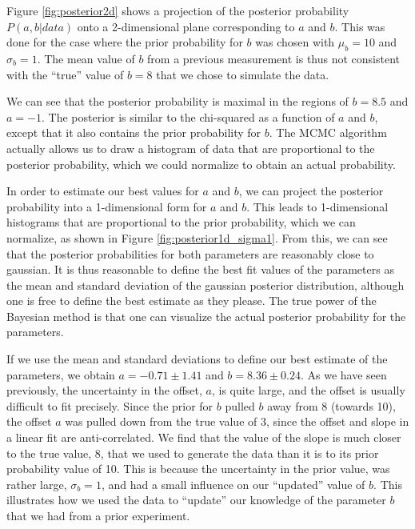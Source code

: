 Figure \ref{fig:posterior2d} shows a projection of the posterior probability $P(a,b|data)$ onto a 2-dimensional plane corresponding to $a$ and $b$. This was done for the case where the prior probability for $b$ was chosen with $\mu_b=10$ and $\sigma_b=1$. The mean value of $b$ from a previous measurement is thus not consistent with the ``true'' value of $b=8$ that we chose to simulate the data. 

We can see that the posterior probability is maximal in the regions of $b=8.5$ and $a=-1$. The posterior is similar to the chi-squared as a function of $a$ and $b$, except that it also contains the prior probability for $b$. The MCMC algorithm actually allows us to draw a histogram of data that are proportional to the posterior probability, which we could normalize to obtain an actual probability.


In order to estimate our best values for $a$ and $b$, we can project the posterior probability into a 1-dimensional form for $a$ and $b$. This leads to 1-dimensional histograms that are proportional to the prior probability, which we can normalize, as shown in Figure \ref{fig:posterior1d_sigma1}. From this, we can see that the posterior probabilities for both parameters are reasonably close to gaussian. It is thus reasonable to define the best fit values of the parameters as the mean and standard deviation of the gaussian posterior distribution, although one is free to define the best estimate as they please. The true power of the Bayesian method is that one can visualize the actual posterior probability for the parameters. 

If we use the mean and standard deviations to define our best estimate of the parameters, we obtain $a=-0.71\pm1.41$ and $b=8.36 \pm  0.24$. As we have seen previously, the uncertainty in the offset, $a$, is quite large, and the offset is usually difficult to fit precisely. Since the prior for $b$ pulled $b$ away from 8 (towards 10), the offset $a$ was pulled down from the true value of 3, since the offset and slope in a linear fit are anti-correlated. We find that the value of the slope is much closer to the true value, 8, that we used to generate the data than it is to its prior probability value of 10. This is because the uncertainty in the prior value, was rather large, $\sigma_b=1$, and had a small influence on our ``updated'' value of $b$. This illustrates how we used the data to ``update'' our knowledge of the parameter $b$ that we had from a prior experiment.

